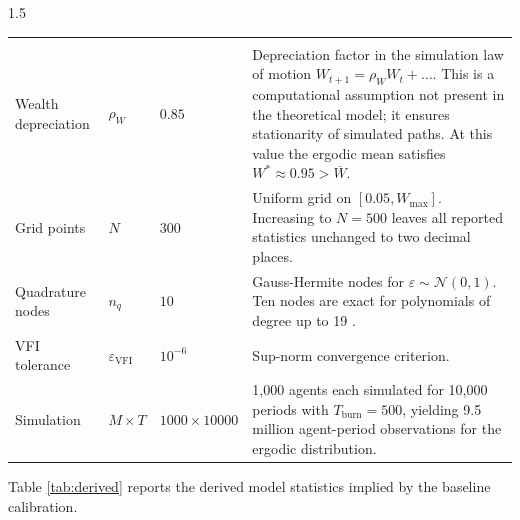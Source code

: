 \documentclass[12pt]{article}
\theoremstyle{definition}
\theoremstyle{plain}
\begin{document}
\begin{spacing}{1.5}
\begin{longtable}{lllp{7cm}}
\pagebreak[4]
\multicolumn{4}{l}{\textit{Computational settings}} \\[2pt]
Wealth depreciation & $\rho_W$ & $0.85$ &
  Depreciation factor in the simulation law of motion $W_{t+1} = \rho_W W_t + \ldots$.
  This is a computational assumption not present in the theoretical model; it
  ensures stationarity of simulated paths. At this value the ergodic mean
  satisfies $W^* \approx 0.95 > \overline{W}$. \\
Grid points & $N$ & $300$ &
  Uniform grid on $[0.05, W_{\max}]$. Increasing to $N = 500$ leaves all
  reported statistics unchanged to two decimal places. \\
Quadrature nodes & $n_{q}$ & $10$ &
  Gauss-Hermite nodes for $\varepsilon \sim \mathcal{N}(0,1)$.
  Ten nodes are exact for polynomials of degree up to 19 \parencite{judd1998}. \\
VFI tolerance & $\varepsilon_{\mathrm{VFI}}$ & $10^{-6}$ &
  Sup-norm convergence criterion. \\
Simulation & $M \times T$ & $1000 \times 10000$ &
  1{,}000 agents each simulated for 10{,}000 periods with $T_{\mathrm{burn}} = 500$,
  yielding 9.5 million agent-period observations for the ergodic distribution. \\
 
\end{longtable}
\endgroup
 
Table \ref{tab:derived} reports the derived model statistics implied by the baseline calibration.
 

\end{spacing}
\end{document}
